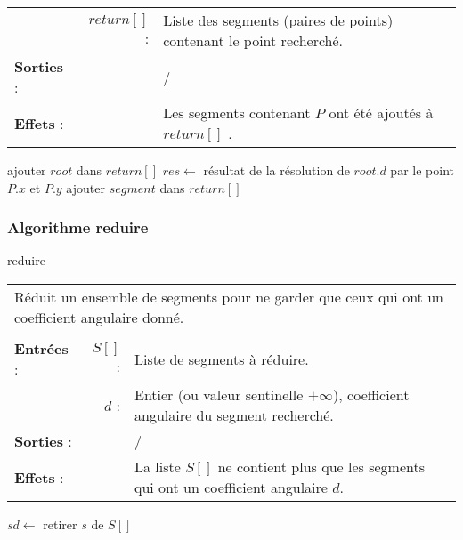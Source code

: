 \documentclass[10pt]{article}
\begin{document}
\begin{algorithm}[H]
\begin{tabular}{lrl}
&$return[]$ :&Liste des segments (paires de points) contenant le point recherché.\\[.25cm]
\textbf{Sorties} :& &/\\[.25cm]
\textbf{Effets} :& &Les segments contenant $P$ ont été ajoutés à $return[]$ .\\[.25cm]
\end{tabular}
\begin{algorithmic}[1]
\State ajouter $root$ dans $return[]$
\EndIf
\Else
\State $res\gets$ résultat de la résolution de $root.d$ par le point $P.x$ et $P.y$
\State {}
\State {}
\Else
{}
\State ajouter $segment$ dans $return[]$
\EndIf
\EndFor
\State{}
\State{}
\EndIf
\EndIf
\EndProcedure
\end{algorithmic}
\end{algorithm}

\subsubsection{Algorithme reduire}
\begin{algorithm}[H]
\caption{reduire}
\begin{tabular}{lrl}
\multicolumn{3}{l}{Réduit un ensemble de segments pour ne garder que ceux qui ont un coefficient angulaire donné.}\\
&&\\
\textbf{Entrées} : &$S[]$ : &Liste de segments à réduire.\\
& $d$ : &Entier (ou valeur sentinelle $+\infty$), coefficient angulaire du segment recherché.\\[.25cm]
\textbf{Sorties} :& &/\\[.25cm]
\textbf{Effets} :& &La liste $S[]$ ne contient plus que les segments qui ont un coefficient angulaire $d$.\\[.25cm]
\end{tabular}
\begin{algorithmic}[1]
\State $sd\gets$
\State retirer $s$ de $S[]$
\EndIf
\EndFor
\EndProcedure
\end{algorithmic}
\end{algorithm}
\end{document}
